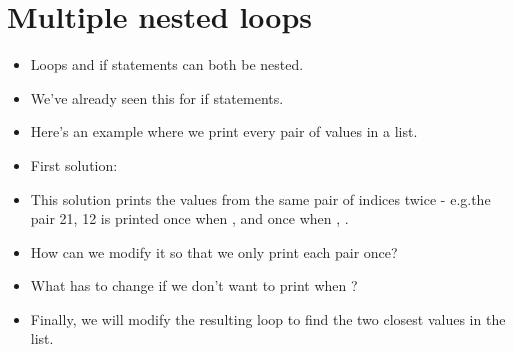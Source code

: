 \documentclass[letterpaper,10pt,english]{sphinxmanual}
\begin{document}
\section{Multiple nested loops}
\label{\detokenize{lecture_notes/lec09_loops1_while:multiple-nested-loops}}\begin{itemize}
\item {} 
Loops and if statements can both be nested.

\item {} 
We’ve already seen this for if statements.

\item {} 
Here’s an example where we print every pair of values in a list.

\item {} 
First solution:

%
\begin{sphinxVerbatim}[commandchars=\\\{\}]
  \PYG{p}{[}     \PYG{p}{]}
  
   

      
       
        \PYG{p}{[}\PYG{p}{]} \PYG{p}{[}\PYG{p}{]}
          

      
\end{sphinxVerbatim}

\item {} 
This solution prints the values from the same pair of indices twice
-  e.g.the pair 21, 12 is printed  once when ,  and
once when , .

\item {} 
How can we modify it so that we only print each pair once?

\item {} 
What has to change if we don’t want to print when ?

\item {} 
Finally, we will modify the resulting loop to find the two closest
values in the list.

\end{itemize}
\end{document}
